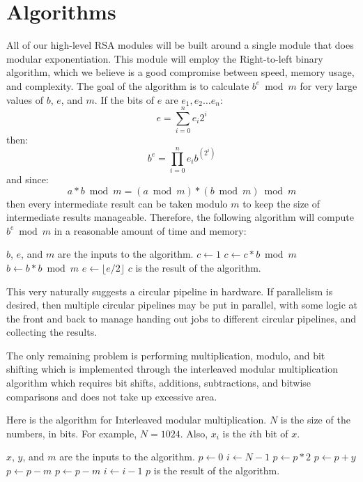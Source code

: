 \documentclass[12pt]{article}
\begin{document}
\section{Algorithms}
All of our high-level RSA modules will be built around a single module that does modular exponentiation.
This module will employ the Right-to-left binary algorithm, which we believe is a good compromise between speed, memory usage, and complexity.
The goal of the algorithm is to calculate $b^e \bmod m$ for very large values of $b$, $e$, and $m$.
If the bits of $e$ are $e_1, e_2 \dots e_n$:
\begin{equation}
e = \sum_{i = 0}^{n} e_i 2^i
\end{equation}
then:
\begin{equation}
b^e = \prod_{i = 0}^{n} e_i b^{(2^i)}
\end{equation}
and since:
\begin{equation}
a * b \bmod m = (a \bmod m) * (b \bmod m) \bmod m
\end{equation}
then every intermediate result can be taken modulo $m$ to keep the size of intermediate results manageable.
Therefore, the following algorithm will compute $b^e \bmod m$ in a reasonable amount of time and memory:
\begin{algorithmic}
\State $b$, $e$, and $m$ are the inputs to the algorithm.
\State $c \gets 1$
		\State $c \gets c * b \bmod m$
	\EndIf
	\State $b \gets b * b \bmod m$
	\State $e \gets \lfloor e / 2 \rfloor$
\EndWhile
\State $c$ is the result of the algorithm.
\end{algorithmic}
This very naturally suggests a circular pipeline in hardware.
If parallelism is desired, then multiple circular pipelines may be put in parallel,
with some logic at the front and back to manage handing out jobs to different circular pipelines,
and collecting the results.

The only remaining problem is performing multiplication, modulo, and bit shifting which is implemented through the interleaved modular multiplication algorithm which requires bit shifts, additions, subtractions, and bitwise comparisons and does not take up excessive area. 


Here is the algorithm for Interleaved modular multiplication.
$N$ is the size of the numbers, in bits. For example, $N = 1024$.
Also, $x_i$ is the $i$th bit of $x$.
\begin{algorithmic}
\State $x$, $y$, and $m$ are the inputs to the algorithm.
\State $p \gets 0$
\State $i \gets N - 1$
	\State $p \gets p * 2$
		\State $p \gets p + y$
	\EndIf
		\State $p \gets p - m$
	\EndIf
		\State $p \gets p - m$
	\EndIf
  \State $i \gets i - 1$
\EndWhile
\State $p$ is the result of the algorithm.
\end{algorithmic}
\end{document}
